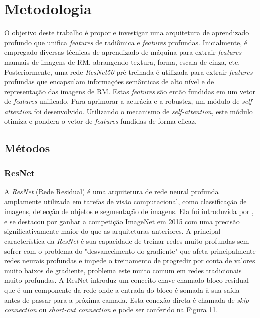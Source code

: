 \chapter{Metodologia} 
\label{chap:metodologia}

O objetivo deste trabalho é propor e investigar uma arquitetura de aprendizado profundo que unifica \textit{features} de radiômica e \textit{features} profundas. Inicialmente, é empregado diversas técnicas de aprendizado de máquina para extrair \textit{features} manuais de imagens de RM, abrangendo textura, forma, escala de cinza, etc. Posteriormente, uma rede \textit{ResNet50} pré-treinada é utilizada para extrair \textit{features} profundas que encapsulam informações semânticas de alto nível e de representação das imagens de RM. Estas \textit{features} são então fundidas em um vetor de \textit{features} unificado. Para aprimorar a acurácia e a robustez, um módulo de \textit{self-attention} foi desenvolvido. Utilizando o mecanismo de \textit{self-attention}, este módulo otimiza e pondera o vetor de \textit{features} fundidas de forma eficaz.

\section{Métodos}
\label{sec:cap4_metodos}

\subsection{ResNet}
\label{subsec:cap4_resnet}

A \textit{ResNet} (Rede Residual) é uma arquitetura de rede neural profunda amplamente utilizada em tarefas de visão computacional, como classificação de imagens, detecção de objetos e segmentação de imagens. Ela foi introduzida por  \cite{heDeepResidualLearning2015}, e se destacou por ganhar a competição ImageNet em 2015 com uma precisão significativamente maior do que as arquiteturas anteriores. A principal característica da \textit{ResNet} é sua capacidade de treinar redes muito profundas sem sofrer com o problema do "desvanecimento do gradiente" que afeta principalmente redes neurais profundas e impede o treinamento de progredir por conta de valores muito baixos de gradiente, problema este muito comum em redes tradicionais muito profundas. A ResNet introduz um conceito chave chamado bloco residual que é um componente da rede onde a entrada do bloco é somada à sua saída antes de passar para a próxima camada. Esta conexão direta é chamada de \textit{skip connection} ou \textit{short-cut connection} e pode ser conferido na Figura 11.


